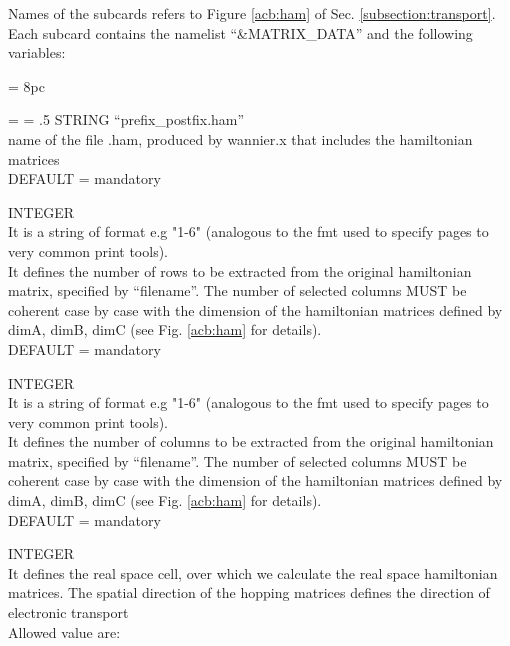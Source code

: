\noindent Names of the subcards refers to Figure \ref{acb:ham} of Sec. \ref{subsection:transport}. \\
\noindent Each subcard contains the namelist ``\&MATRIX\_DATA'' and the following variables:

\newdimen\descindent \descindent = 8pc
{\noindent \leftskip = \descindent \parskip = .5\baselineskip
{}%
STRING ``prefix\_postfix.ham''\\
name of the file .ham, produced by wannier.x that includes the hamiltonian matrices\\
              DEFAULT = mandatory \par

\noindent{}%
INTEGER \\ It is a string of format e.g "1-6" (analogous to the fmt used
              to specify pages to very common print tools).\\
It defines the number of rows to be extracted from the original
hamiltonian matrix, specified by ``filename''. The number of selected columns MUST be coherent case by case with the
dimension of the hamiltonian matrices defined by dimA, dimB, dimC (see Fig. \ref{acb:ham}
for details).\\
              DEFAULT = mandatory \par

\noindent{}%
INTEGER \\ It is a string of format e.g "1-6" (analogous to the fmt used
              to specify pages to very common print tools).\\
It defines the number of columns to be extracted from the original
hamiltonian matrix, specified by ``filename''. The number of selected columns MUST be coherent case by case with the
dimension of the hamiltonian matrices defined by dimA, dimB, dimC (see Fig. \ref{acb:ham}
for details).\\
              DEFAULT = mandatory \par

\noindent{}%
INTEGER \\ It defines the real space cell, over which we calculate the real space hamiltonian matrices.
The spatial direction  of the hopping matrices defines the direction of electronic transport\\
Allowed value are:\\

}
